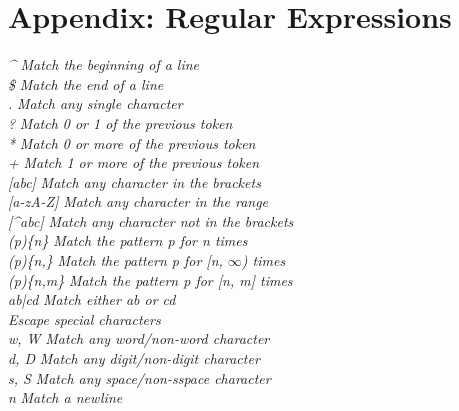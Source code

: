 \section*{Appendix: Regular Expressions}

\emph{\^{}} \hfill \textit{Match the beginning of a line}\\
\emph{\$} \hfill \textit{Match the end of a line}\\
\emph{.} \hfill \textit{Match any single character}\\
\emph{?} \hfill \textit{Match 0 or 1 of the previous token}\\
\emph{*} \hfill \textit{Match 0 or more of the previous token}\\
\emph{+} \hfill \textit{Match 1 or more of the previous token}\\
\emph{[abc]} \hfill \textit{Match any character in the brackets}\\
\emph{[a-zA-Z]} \hfill \textit{Match any character in the range}\\
\emph{[\^{}abc]} \hfill \textit{Match any character not in the brackets}\\
\emph{(p)\{n\}} \hfill \textit{Match the pattern p for n times}\\
\emph{(p)\{n,\}} \hfill \textit{Match the pattern p for [n, $\infty$) times}\\
\emph{(p)\{n,m\}} \hfill \textit{Match the pattern p for [n, m] times}\\
\emph{ab|cd} \hfill \textit{Match either ab or cd}\\
\emph{\bs} \hfill \textit{Escape special characters}\\
\emph{\bs w, \bs W} \hfill \textit{Match any word/non-word character}\\
\emph{\bs d, \bs D} \hfill \textit{Match any digit/non-digit character}\\
\emph{\bs s, \bs S} \hfill \textit{Match any space/non-sspace character}\\
\emph{\bs n} \hfill \textit{Match a newline}\\